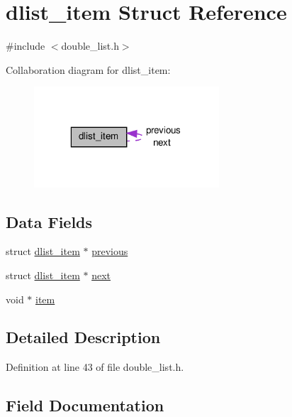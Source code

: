 \hypertarget{structdlist__item}{}\section{dlist\+\_\+item Struct Reference}
\label{structdlist__item}


{\ttfamily \#include $<$double\+\_\+list.\+h$>$}



Collaboration diagram for dlist\+\_\+item\+:
\nopagebreak
\begin{figure}[H]
\begin{center}
\leavevmode
\includegraphics[width=196pt]{structdlist__item__coll__graph}
\end{center}
\end{figure}
\subsection*{Data Fields}
\begin{DoxyCompactItemize}
\item 
struct \hyperlink{structdlist__item}{dlist\+\_\+item} $\ast$ \hyperlink{structdlist__item_ae9f34aed963ea0c93ef044c826ca5081}{previous}
\item 
struct \hyperlink{structdlist__item}{dlist\+\_\+item} $\ast$ \hyperlink{structdlist__item_a1f0e35d7e536edc712977fa711d91d08}{next}
\item 
void $\ast$ \hyperlink{structdlist__item_a68a29ea7339b306a22a9ad0a0cf5a40f}{item}
\end{DoxyCompactItemize}


\subsection{Detailed Description}


Definition at line 43 of file double\+\_\+list.\+h.



\subsection{Field Documentation}
\hypertarget{structdlist__item_a68a29ea7339b306a22a9ad0a0cf5a40f}{}
